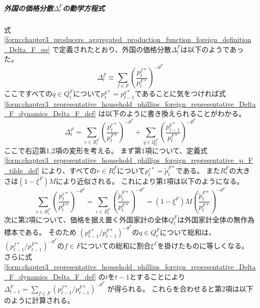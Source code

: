\subparagraph{外国の価格分散\(\Delta_t^F\)の動学方程式}
\label{sec:chapter3_representative_household_phillips_foreign_representative_Delta_F_dynamics}
式
\eqref{form:chapter3_producers_aggregated_production_function_foreign_definition_Delta_F_eq}
で定義されたとおり、外国の価格分散\(\Delta_t^F\)は以下のようであった。
\begin{equation}
\label{form:chapter3_representative_household_phillips_foreign_representative_Delta_F_dynamics_Delta_F_def}
    \Delta_t^F
    \equiv\sum_{f\in F}\left(\frac{p_t^{f*}}{p_t^{F*}}\right)^{-\theta^F}
\end{equation}
ここですべての\(q\in Q_t^F\)について\(p_t^{q*}=p_{t-1}^{q*}\)であることに気をつければ式
\eqref{form:chapter3_representative_household_phillips_foreign_representative_Delta_F_dynamics_Delta_F_def}
は以下のように書き換えられることがわかる。
\begin{equation}
\label{form:chapter3_representative_household_phillips_foreign_representative_Delta_F_dynamics_Delta_F_modified_eq}
    \Delta_t^F
    =\sum_{r\in R_t^F}\left(\frac{p_t^{r*}}{p_t^{F*}}\right)^{-\theta^F}+\sum_{q\in Q_t^F}\left(\frac{p_{t-1}^{q*}}{p_t^{F*}}\right)^{-\theta^F}
\end{equation}
ここで右辺第1,2項の変形を考える。
まず第1項について、定義式
\eqref{form:chapter3_representative_household_phillips_foreign_representative_p_F_tilde_def}
により、すべての\(r\in R_t^F\)について\(p_t^{r*}=\widetilde{p}_t^{F*}\)である。
また\(R_t^F\)の大きさは\((1-\xi^F)M\)により近似される。
これにより第1項は以下のようになる。
\begin{equation}
\label{form:chapter3_representative_household_phillips_foreign_representative_Delta_F_dynamics_Delta_F_modified_first_term_eq}
    \sum_{r\in R_t^F}\left(\frac{p_t^{r*}}{p_t^{F*}}\right)^{-\theta^F}
    =\sum_{r\in R_t^F}\left(\frac{\widetilde{p}_t^{F*}}{p_t^{F*}}\right)^{-\theta^F}
    =(1-\xi^F)M\left(\frac{\widetilde{p}_t^{F*}}{p_t^{F*}}\right)^{-\theta^F}
\end{equation}
次に第2項について、価格を据え置く外国家計の全体\(Q_t^F\)は外国家計全体の無作為標本である。
そのため
\((p_{t-1}^{q*}/p_{t-1}^{F*})^{-\theta^F}\)の\(q\in Q_t^F\)について総和は、
\((p_{t-1}^{f*}/p_{t-1}^{F*})^{-\theta^F}\)の\(f\in F\)についての総和に割合\(\xi^F\)を掛けたものに等しくなる。
さらに式
\eqref{form:chapter3_representative_household_phillips_foreign_representative_Delta_F_dynamics_Delta_F_def}
の\(t\)を\(t-1\)とすることにより
\(\Delta_{t-1}^F=\sum_{f\in F}(p_{t-1}^{f*}/p_{t-1}^{F*})^{-\theta^F}\)
が得られる。
これらを合わせると第2項は以下のように計算される。
